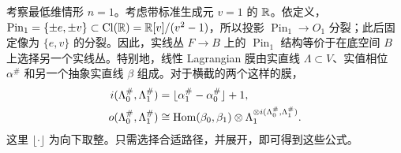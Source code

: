 \begin{example}\label{st:11.20}
考察最低维情形 $n=1$。考虑带标准生成元 $v=1$ 的 $\mathbb R$。依定义，$\operatorname{Pin}_1=\{\pm e,\allowbreak \pm v\}\subset\operatorname{Cl}(\mathbb R)=\mathbb R[v]/(v^2-1)$，所以投影 $\operatorname{Pin}_1\to O_1$ 分裂；此后固定像为 $\{e,\allowbreak v\}$ 的分裂。因此，实线丛 $F\to B$ 上的 $\operatorname{Pin}_1$ 结构等价于在底空间 $B$ 上选择另一个实线丛。特别地，线性 Lagrangian 膜由实直线 $\Lambda\subset V$、实值相位 $\alpha^\#$ 和另一个抽象实直线 $\beta$ 组成。对于横截的两个这样的膜，
\begin{equation}\label{eq:11.35}
\begin{aligned}
i(\Lambda_0^\#,\Lambda_1^\#)&=\lfloor\alpha_1^\#-\alpha_0^\#\rfloor+1,\\
o(\Lambda_0^\#,\Lambda_1^\#)&\cong\operatorname{Hom}(\beta_0,\beta_1)\otimes\Lambda_1^{\otimes i(\Lambda_0^\#,\Lambda_1^\#)}.
\end{aligned}
\end{equation}
这里 $\lfloor\cdot\rfloor$ 为向下取整。只需选择合适路径，并展开，即可得到这些公式。
\end{example}

